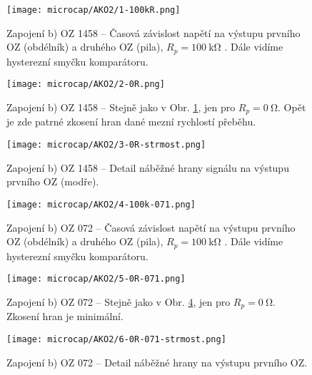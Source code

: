 

\begin{figure}[h!]
    \centering
    \texttt{[image: microcap/AKO2/1-100kR.png]}
    \caption{Zapojení b) OZ 1458 -- Časová závislost napětí na výstupu prvního OZ (obdélník) a druhého OZ (pila), \(R_{p} =\qty{100}{\kilo\ohm}\) . Dále vidíme hysterezní smyčku komparátoru.}
    \label{fig:microcap/AKO2/1-100kR.png}
\end{figure}

\begin{figure}[h!]
    \centering
    \texttt{[image: microcap/AKO2/2-0R.png]}
    \caption{Zapojení b) OZ 1458 -- Stejně jako v Obr. \ref{fig:microcap/AKO2/1-100kR.png}, jen pro \(R_{p} =\qty{0}{\ohm}\). Opět je zde patrné zkosení hran dané mezní rychlostí přeběhu.}
    \label{fig:microcap/AKO2/2-0R.png}
\end{figure}

\begin{figure}[h!]
    \centering
    \texttt{[image: microcap/AKO2/3-0R-strmost.png]}
    \caption{Zapojení b) OZ 1458 -- Detail náběžné hrany signálu na výstupu prvního OZ (modře).}
    \label{fig:microcap/AKO2/3-0R-strmost.png}
\end{figure}

\begin{figure}[h!]
    \centering
    \texttt{[image: microcap/AKO2/4-100k-071.png]}
    \caption{Zapojení b) OZ 072 -- Časová závislost napětí na výstupu prvního OZ (obdélník) a druhého OZ (pila), \(R_{p} =\qty{100}{\kilo\ohm}\) . Dále vidíme hysterezní smyčku komparátoru.}
    \label{fig:microcap/AKO2/4-100k-071.png}
\end{figure}

\begin{figure}[h!]
    \centering
    \texttt{[image: microcap/AKO2/5-0R-071.png]}
    \caption{Zapojení b) OZ 072 -- Stejně jako v Obr. \ref{fig:microcap/AKO2/4-100k-071.png}, jen pro \(R_{p} =\qty{0}{\ohm}\). Zkosení hran je minimální.}
    \label{fig:microcap/AKO2/5-0R-071.png}
\end{figure}

\begin{figure}[h!]
    \centering
    \texttt{[image: microcap/AKO2/6-0R-071-strmost.png]}
    \caption{Zapojení b) OZ 072 -- Detail náběžné hrany na výstupu prvního OZ.}
    \label{fig:microcap/AKO2/6-0R-071-strmost.png}
\end{figure}

